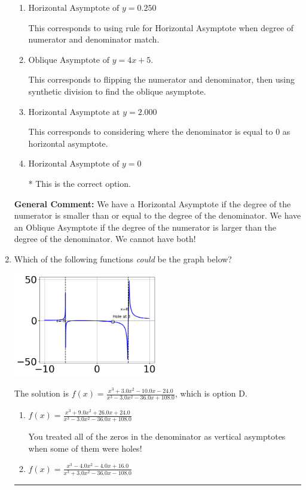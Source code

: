 \documentclass{extbook}[14pt]
\newcommand{\litem}[1]{\item #1

\rule{\textwidth}{0.4pt}}
\begin{document}
\begin{enumerate}
{\begin{enumerate}[label=\Alph*.]
This corresponds to believing there can be both a horizontal and oblique asymptote.
\item \( \text{Horizontal Asymptote of } y = 0.250  \)

This corresponds to using rule for Horizontal Asymptote when degree of numerator and denominator match.
\item \( \text{Oblique Asymptote of } y = 4x + 5. \)

This corresponds to flipping the numerator and denominator, then using synthetic division to find the oblique asymptote.
\item \( \text{Horizontal Asymptote at } y = 2.000 \)

This corresponds to considering where the denominator is equal to 0 as horizontal asymptote.
\item \( \text{Horizontal Asymptote of } y = 0 \)

* This is the correct option.
\end{enumerate}

\textbf{General Comment:} We have a Horizontal Asymptote if the degree of the numerator is smaller than or equal to the degree of the denominator. We have an Oblique Asymptote if the degree of the numerator is larger than the degree of the denominator. We cannot have both!
}
\litem{
Which of the following functions \textit{could} be the graph below?

\begin{center}
    \includegraphics[width=0.5\textwidth]{../Figures/identifyGraphOfRationalFunctionCopyB.png}
\end{center}


The solution is \( f(x)=\frac{x^{3} +3.0 x^{2} -10.0 x -24.0}{x^{3} -3.0 x^{2} -36.0 x + 108.0} \), which is option D.\begin{enumerate}[label=\Alph*.]
\item \( f(x)=\frac{x^{3} +9.0 x^{2} +26.0 x + 24.0}{x^{3} -3.0 x^{2} -36.0 x + 108.0} \)

You treated all of the zeros in the denominator as vertical asymptotes when some of them were holes!
\item \( f(x)=\frac{x^{3} -4.0 x^{2} -4.0 x + 16.0}{x^{3} +3.0 x^{2} -36.0 x -108.0} \)


\end{enumerate}}
\end{enumerate}
\end{document}
